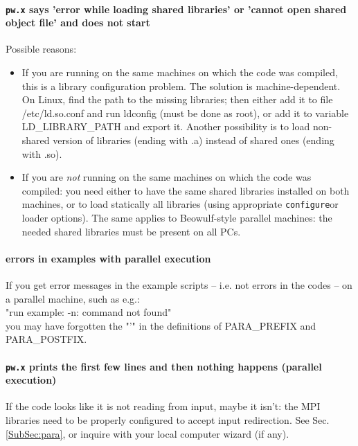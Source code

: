 \documentclass[12pt,a4paper]{article}
\def\pw.x{\texttt{pw.x}}
\def\configure{\texttt{configure}}
\begin{document}
\paragraph{\pw.x says 'error while loading shared libraries' or
  'cannot open shared object file' and does not start} 
Possible reasons:
\begin{itemize}
\item If you are running on the same machines on which the code was
  compiled, this is a library configuration problem. The solution is
  machine-dependent. On Linux, find the path to the missing libraries;
  then either add it to file /etc/ld.so.conf and run ldconfig (must be
  done as root), or add it to variable LD\_LIBRARY\_PATH and export
  it. Another possibility is to load non-shared version of libraries
  (ending with .a)  instead of shared ones (ending with .so). 
\item If you are {\em not} running on the same machines on which the
  code was compiled: you need either to have the same shared libraries
  installed on both machines, or to load statically all libraries
  (using appropriate \configure or loader options). The same applies to
  Beowulf-style parallel machines: the needed shared libraries must be
  present on all PCs. 
\end{itemize}

\paragraph{errors in examples with parallel execution}

If you get error messages in the example scripts -- i.e. not errors in
the codes -- on a parallel machine, such as e.g.: \\
"run example: -n: command not found" \\
you may have forgotten 
the "'" in the definitions of PARA\_PREFIX and PARA\_POSTFIX.

\paragraph{\pw.x prints the first few lines and then nothing happens
  (parallel execution)} 
If the code looks like it is not reading from input, maybe
it isn't: the MPI libraries need to be properly configured to accept input
redirection. See Sec.\ref{SubSec:para}, or inquire with
your local computer wizard (if any).
\end{document}
